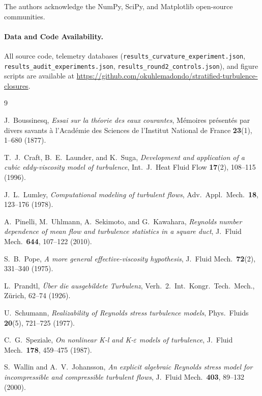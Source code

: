 \documentclass[preprint,aps,prb,longbibliography,superscriptaddress]{revtex4-2}
\begin{document}
\begin{acknowledgments}
The authors acknowledge the NumPy, SciPy, and Matplotlib open-source communities.
\end{acknowledgments}

\paragraph*{Data and Code Availability.}
All source code, telemetry databases (\texttt{results\_curvature\_experiment.json},
\texttt{results\_audit\_experiments.json}, \texttt{results\_round2_controls.json}),
and figure scripts are available at
\url{https://github.com/okuhlemadondo/stratified-turbulence-closures}.

\begin{thebibliography}{9}

  J.~Boussinesq,
  \emph{Essai sur la th\'eorie des eaux courantes},
  M\'emoires pr\'esent\'es par divers savants \`a l'Acad\'emie des Sciences
  de l'Institut National de France \textbf{23}(1), 1--680 (1877).

  T.~J.~Craft, B.~E.~Launder, and K.~Suga,
  \emph{Development and application of a cubic eddy-viscosity model of
    turbulence},
  Int.\ J.\ Heat Fluid Flow \textbf{17}(2), 108--115 (1996).

  J.~L.~Lumley,
  \emph{Computational modeling of turbulent flows},
  Adv.\ Appl.\ Mech.\ \textbf{18}, 123--176 (1978).

  A.~Pinelli, M.~Uhlmann, A.~Sekimoto, and G.~Kawahara,
  \emph{Reynolds number dependence of mean flow and turbulence statistics in a
    square duct},
  J.\ Fluid Mech.\ \textbf{644}, 107--122 (2010).

  S.~B.~Pope,
  \emph{A more general effective-viscosity hypothesis},
  J.\ Fluid Mech.\ \textbf{72}(2), 331--340 (1975).

  L.~Prandtl,
  \emph{\"Uber die ausgebildete Turbulenz},
  Verh.\ 2.\ Int.\ Kongr.\ Tech.\ Mech., Z\"urich, 62--74 (1926).

  U.~Schumann,
  \emph{Realizability of Reynolds stress turbulence models},
  Phys.\ Fluids \textbf{20}(5), 721--725 (1977).

  C.~G.~Speziale,
  \emph{On nonlinear K-l and K-$\varepsilon$ models of turbulence},
  J.\ Fluid Mech.\ \textbf{178}, 459--475 (1987).

  S.~Wallin and A.~V.~Johansson,
  \emph{An explicit algebraic Reynolds stress model for incompressible and
    compressible turbulent flows},
  J.\ Fluid Mech.\ \textbf{403}, 89--132 (2000).

\end{thebibliography}
\end{document}
